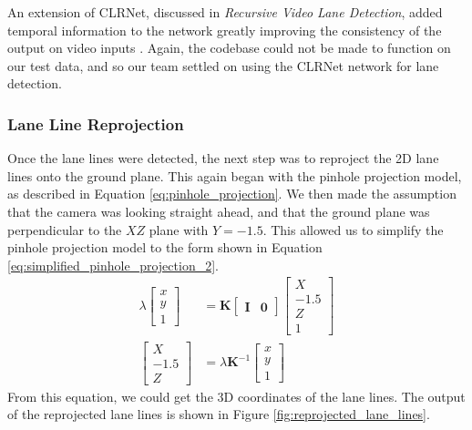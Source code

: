 An extension of CLRNet, discussed in \emph{Recursive Video Lane Detection}, added temporal information to the network greatly improving the consistency of the output on video inputs \cite{RVLD}. Again, the codebase could not be made to function on our test data, and so our team settled on using the CLRNet network for lane detection.

\subsubsection{Lane Line Reprojection}
Once the lane lines were detected, the next step was to reproject the 2D lane lines onto the ground plane. This again began with the pinhole projection model, as described in Equation \ref{eq:pinhole_projection}. We then made the assumption that the camera was looking straight ahead, and that the ground plane was perpendicular to the $XZ$ plane with $Y = -1.5$. This allowed us to simplify the pinhole projection model to the form shown in Equation \ref{eq:simplified_pinhole_projection_2}.
\begin{equation}\label{eq:simplified_pinhole_projection_2}
\begin{aligned}
  \lambda\begin{bmatrix}
    x \\
    y \\
    1
  \end{bmatrix}
  & =
  \mathbf{K}
  \begin{bmatrix}
      \mathbf{I} & \mathbf{0}
  \end{bmatrix}
  \begin{bmatrix}
      X \\
      -1.5 \\
      Z \\
      1
  \end{bmatrix} \\
  \begin{bmatrix}
    X \\
    -1.5 \\
    Z
  \end{bmatrix}
  & =
  \lambda \mathbf{K}^{-1} \begin{bmatrix}
    x \\
    y \\
    1
  \end{bmatrix}
\end{aligned}
\end{equation}
From this equation, we could get the 3D coordinates of the lane lines. The output of the reprojected lane lines is shown in Figure \ref{fig:reprojected_lane_lines}.

